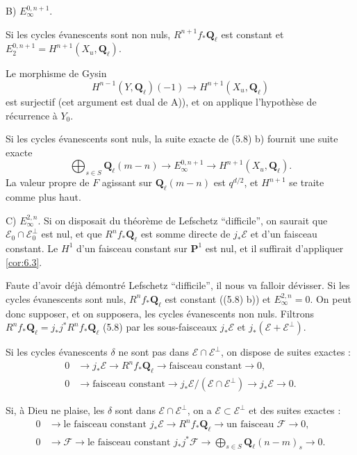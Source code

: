 \documentclass[12pt,a4paper]{amsart}
\theoremstyle{plain}
\theoremstyle{definition}
\theoremstyle{remark}
\newcommand{\Q}{\mathbf{Q}}
\numberwithin{equation}{section}
\begin{document}
\noindent B) $E_\infty^{0,n+1}$.

Si les cycles \'evanescents sont non nuls, $R^{n+1}f_\ast\Q_\ell$ est constant et $E_2^{0,n+1}=H^{n+1}(X_u,\Q_\ell)$.

Le morphisme de Gysin
\[
H^{n-1}(Y,\Q_\ell)(-1) \longrightarrow H^{n+1}(X_u,\Q_\ell)
\]
est surjectif (cet argument est dual de A)), et on applique l'hypoth\`ese de r\'ecurrence \`a $Y_0$.

Si les cycles \'evanescents sont nuls, la suite exacte de (5.8) b) fournit une suite exacte
\[
\bigoplus_{s\in S} \Q_\ell(m-n) \longrightarrow E_\infty^{0,n+1} \longrightarrow H^{n+1}(X_u,\Q_\ell).
\]
La valeur propre de $F$ agissant sur $\Q_\ell(m-n)$ est $q^{d/2}$, et $H^{n+1}$ se traite comme plus haut.

\noindent C) $E_\infty^{2,n}$. Si on disposait du th\'eor\`eme de Lefschetz ``difficile'', on saurait que $\mathscr{E}_0\cap\mathscr{E}_0^\perp$ est nul, et que $R^n f_\ast\Q_\ell$ est somme directe de $j_\ast\mathscr{E}$ et d'un faisceau constant. Le $H^1$ d'un faisceau constant sur $\mathbf{P}^1$ est nul, et il suffirait d'appliquer \eqref{cor:6.3}.

Faute d'avoir d\'ej\`a d\'emontr\'e Lefschetz ``difficile'', il nous va falloir d\'evisser. Si les cycles \'evanescents sont nuls, $R^n f_\ast\Q_\ell$ est constant ((5.8) b)) et $E_\infty^{2,n}=0$. On peut donc supposer, et on supposera, les cycles \'evanescents non nuls. Filtrons $R^n f_\ast\Q_\ell = j_\ast j^\ast R^n f_\ast\Q_\ell$ (5.8) par les sous-faisceaux $j_\ast\mathscr{E}$ et $j_\ast(\mathscr{E}+\mathscr{E}^\perp)$.

Si les cycles \'evanescents $\delta$ ne sont pas dans $\mathscr{E}\cap\mathscr{E}^\perp$, on dispose de suites exactes :
\begin{align}
0 &\longrightarrow j_\ast\mathscr{E} \longrightarrow R^n f_\ast\Q_\ell \longrightarrow \text{faisceau constant} \longrightarrow 0, \label{eq:7.1.2} \\
0 &\longrightarrow \text{faisceau constant} \longrightarrow j_\ast\mathscr{E}/(\mathscr{E}\cap\mathscr{E}^\perp) \longrightarrow j_\ast\mathscr{E} \longrightarrow 0. \label{eq:7.1.3}
\end{align}

Si, \`a Dieu ne plaise, les $\delta$ sont dans $\mathscr{E}\cap\mathscr{E}^\perp$, on a $\mathscr{E}\subset\mathscr{E}^\perp$ et des suites exactes :
\begin{align}
0 &\longrightarrow \text{le faisceau constant } j_\ast\mathscr{E} \longrightarrow R^n f_\ast\Q_\ell \longrightarrow \text{un faisceau } \mathscr{F} \longrightarrow 0, \label{eq:7.1.4} \\
0 &\longrightarrow \mathscr{F} \longrightarrow \text{le faisceau constant } j_\ast j^\ast\mathscr{F} \longrightarrow \bigoplus_{s\in S} \Q_\ell(n-m)_s \longrightarrow 0. \label{eq:7.1.5}
\end{align}
\end{document}
